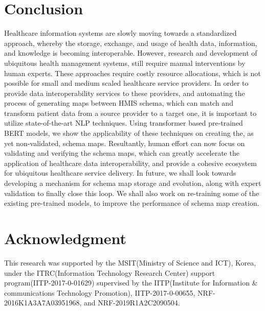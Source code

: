 \documentclass{ieeeaccess}
\begin{document}
\section{Conclusion}
Healthcare information systems are slowly moving towards a standardized approach, whereby the storage, exchange, and usage of health data, information, and knowledge is becoming interoperable. However, research and development of ubiquitous health management systems, still require manual interventions by human experts. These approaches require costly resource allocations, which is not possible for small and medium scaled healthcare service providers. In order to provide data interoperability services to these providers, and automating the process of generating maps between HMIS schema, which can match and transform patient data from a source provider to a target one, it is important to utilize state-of-the-art NLP techniques. Using transformer based pre-trained BERT models, we show the applicability of these techniques on creating the, as yet non-validated, schema maps. Resultantly, human effort can now focus on validating and verifying the schema maps, which can greatly accelerate the application of healthcare data interoperability, and provide a cohesive ecosystem for ubiquitous healthcare service delivery.
In future, we shall look towards developing a mechanism for schema map storage and evolution, along with expert validation to finally close this loop. We shall also work on re-training some of the existing pre-trained models, to improve the performance of schema map creation.


\section*{Acknowledgment}
This research was supported by the MSIT(Ministry of Science and ICT), Korea, under the ITRC(Information Technology Research Center) support program(IITP-2017-0-01629) supervised by the IITP(Institute for Information \& communications Technology Promotion), IITP-2017-0-00655, NRF-2016K1A3A7A03951968, and NRF-2019R1A2C2090504.



\end{document}
